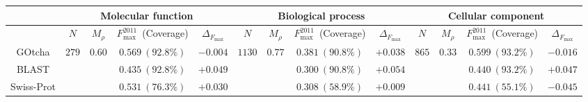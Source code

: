 \begin{tabular}{c|cccc|cccc|cccc}
\hline
& \multicolumn{4}{c|}{Molecular function}
& \multicolumn{4}{c}{Biological process}
& \multicolumn{4}{|c}{Cellular component} \\ \hline \hline
&
$N$ & $M_{\rho}$ & $F_{\max}^{2011}$~(Coverage) & $\Delta_{F_{\max}}$ &
$N$ & $M_{\rho}$ & $F_{\max}^{2011}$~(Coverage) & $\Delta_{F_{\max}}$ &
$N$ & $M_{\rho}$ & $F_{\max}^{2011}$~(Coverage) & $\Delta_{F_{\max}}$ \\ \hline 
GOtcha &
\multirow{3}{*}{$279$} & \multirow{3}{*}{$0.60$} & $0.569~(92.8\%)$ & $-0.004$ &
\multirow{3}{*}{$1130$} & \multirow{3}{*}{$0.77$} & $0.381~(90.8\%)$ & $+0.038$ &
\multirow{3}{*}{$865$} & \multirow{3}{*}{$0.33$} & $0.599~(93.2\%)$ & $-0.016$ \\
BLAST &
& & $0.435~(92.8\%)$ & $+0.049$ &
& & $0.300~(90.8\%)$ & $+0.054$ &
& & $0.440~(93.2\%)$ & $+0.047$ \\
Swiss-Prot &
& & $0.531~(76.3\%)$ & $+0.030$ &
& & $0.308~(58.9\%)$ & $+0.009$ &
& & $0.441~(55.1\%)$ & $-0.045$ \\
\hline
\end{tabular}
